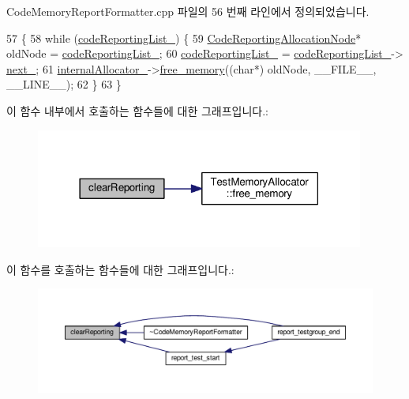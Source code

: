 Code\+Memory\+Report\+Formatter.\+cpp 파일의 56 번째 라인에서 정의되었습니다.


\begin{DoxyCode}
57 \{
58     \textcolor{keywordflow}{while} (\hyperlink{class_code_memory_report_formatter_a7256d2e6da45bdd7eaa77637be299e56}{codeReportingList\_}) \{
59         \hyperlink{struct_code_reporting_allocation_node}{CodeReportingAllocationNode}* oldNode = 
      \hyperlink{class_code_memory_report_formatter_a7256d2e6da45bdd7eaa77637be299e56}{codeReportingList\_};
60         \hyperlink{class_code_memory_report_formatter_a7256d2e6da45bdd7eaa77637be299e56}{codeReportingList\_} = \hyperlink{class_code_memory_report_formatter_a7256d2e6da45bdd7eaa77637be299e56}{codeReportingList\_}->
      \hyperlink{struct_code_reporting_allocation_node_a8f0c58c5a02860822d947c32e435bd3c}{next\_};
61         \hyperlink{class_code_memory_report_formatter_a5177d1223b6c18bfc2ddfb40e8400d84}{internalAllocator\_}->\hyperlink{class_test_memory_allocator_a529ac9813d3b0836ce0b964449942534}{free\_memory}((\textcolor{keywordtype}{char}*) oldNode, \_\_FILE\_\_, \_\_LINE\_\_);
62     \}
63 \}
\end{DoxyCode}


이 함수 내부에서 호출하는 함수들에 대한 그래프입니다.\+:
\nopagebreak
\begin{figure}[H]
\begin{center}
\leavevmode
\includegraphics[width=306pt]{class_code_memory_report_formatter_a8bdb7334ae0af7865a368903e7e9c3b3_cgraph}
\end{center}
\end{figure}




이 함수를 호출하는 함수들에 대한 그래프입니다.\+:
\nopagebreak
\begin{figure}[H]
\begin{center}
\leavevmode
\includegraphics[width=350pt]{class_code_memory_report_formatter_a8bdb7334ae0af7865a368903e7e9c3b3_icgraph}
\end{center}
\end{figure}


